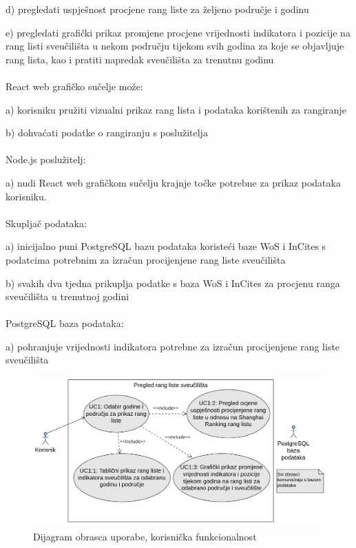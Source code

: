 \documentclass[times, utf8, zavrsni]{fer}
\begin{document}
d) pregledati uspješnost procjene rang liste za željeno područje i godinu

e) pregledati grafički prikaz promjene procjene vrijednosti indikatora i pozicije na rang listi sveučilišta u nekom području tijekom svih godina 
za koje se objavljuje rang lista, kao i pratiti napredak sveučilišta za trenutnu godinu
\\
\\React web grafičko sučelje može:

a) korisniku pružiti vizualni prikaz rang lista i podataka korištenih za rangiranje

b) dohvaćati podatke o rangiranju s poslužitelja
\\
\\Node.js poslužitelj:

a) nudi React web grafičkom sučelju krajnje točke potrebne za prikaz podataka korisniku.
\\\\
Skupljač podataka:

a) inicijalno puni PostgreSQL bazu podataka koristeći baze WoS i InCites s \\podatcima potrebnim za izračun procijenjene rang liste sveučilišta

b) svakih dva tjedna prikuplja podatke s baza WoS i InCites za procjenu ranga sveučilišta u trenutnoj godini
\\
\\PostgreSQL baza podataka:
 
a) pohranjuje vrijednosti indikatora potrebne za izračun procijenjene rang liste sveučilišta
\\
\begin{figure}[htb]
    \hspace*{-2cm}
    \includegraphics[scale=0.4]{slika1.png}
    \caption{Dijagram obrasca uporabe, korisnička funkcionalnost}
    \label{fig:korisnik}
    \end{figure}
\newpage
\end{document}
